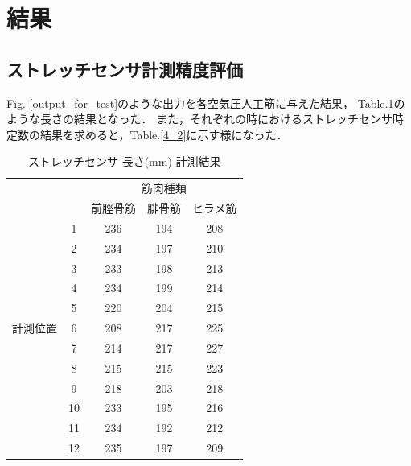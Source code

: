 \section{結果}
\subsection{ストレッチセンサ計測精度評価}
Fig. \ref{output_for_test}のような出力を各空気圧人工筋に与えた結果，
Table.\ref{strain}のような長さの結果となった．
また，それぞれの時におけるストレッチセンサ時定数の結果を求めると，Table.\ref{4_2}に示す様になった．
\begin{table}[h]
    \caption{ストレッチセンサ 長さ(mm) 計測結果}
    \label{strain}
    \begin{center}
        \begin{tabular}{|c|c|ccc|}\hline
            \multicolumn{2}{|c|}{} & \multicolumn{3}{c|}{筋肉種類}\\
            \cline{3-5}
            \multicolumn{2}{|c|}{} & 前脛骨筋 & 腓骨筋 & ヒラメ筋 \\ \hline
            & 1 & 236 & 194 & 208 \\ \cline{2-5}
            & 2 & 234 & 197 & 210 \\ \cline{2-5}
            & 3 & 233 & 198 & 213 \\ \cline{2-5}
            & 4 & 234 & 199 & 214 \\ \cline{2-5}
            & 5 & 220 & 204 & 215 \\ \cline{2-5}
            計測位置 & 6 & 208 & 217 & 225 \\ \cline{2-5}
            & 7 & 214 & 217 & 227 \\ \cline{2-5}
            & 8 & 215 & 215 & 223 \\ \cline{2-5}
            & 9 & 218 & 203 & 218 \\ \cline{2-5}
            & 10 & 233 & 195 & 216 \\ \cline{2-5}
            & 11 & 234 & 192 & 212 \\ \cline{2-5}
            & 12 & 235 & 197 & 209 \\ \hline
        \end{tabular}
    \end{center}
\end{table}

\newpage

